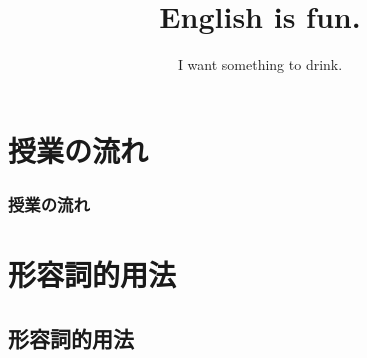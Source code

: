 \documentclass[aspectratio=169,xcolor={dvipsnames,table}]{beamer}
\title{English is fun.}
\subtitle{I want something to drink.}
\author{}
\institute[]{}
\date[]
\begin{document}
\begin{frame}[plain]
  \titlepage
\end{frame}

\section*{授業の流れ}
\begin{frame}[plain]
  \frametitle{授業の流れ}
  \tableofcontents
\end{frame}

\section{形容詞的用法}
\subsection{形容詞的用法}
\end{document}

